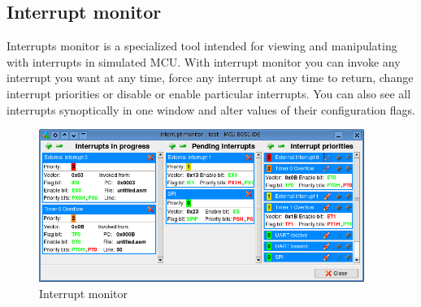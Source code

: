 \documentclass[a4paper,twoside,12pt]{book}
\begin{document}
		\subsection{Interrupt monitor}
			Interrupts monitor is a specialized tool intended for viewing and manipulating with interrupts in simulated MCU. With interrupt monitor you can invoke any interrupt you want at any time, force any interrupt at any time to return,  change interrupt priorities or disable or enable particular interrupts. You can also see all interrupts synoptically in one window and alter values of their configuration flags.
			\begin{figure}[h!]
				\centering{}
				\includegraphics[width=300pt]{img/018.png}
				\caption{Interrupt monitor}
			\end{figure}
\end{document}
